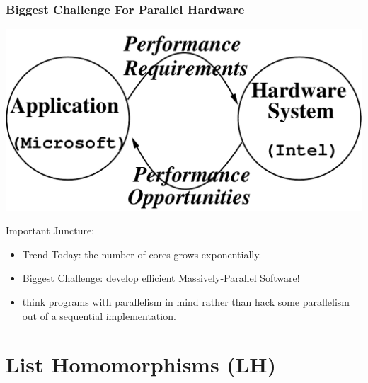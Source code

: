 \documentclass{beamer}
\renewcommand{\emph}[1]{\textcolor{structure}{#1}}
\newcommand{\emp}[1]{\textcolor{DikuRed}{ #1}}
\begin{document}
\begin{frame}[fragile,t]
\frametitle{Biggest Challenge For Parallel Hardware}

\bigskip

\includegraphics[width=29ex]{Figures/L1/Synergy}
\bigskip\pause


\emp{Important Juncture:}\medskip
\begin{itemize}
            \item \emph{Trend Today: the number of cores grows exponentially.}\medskip
            \item \alert{Biggest Challenge: develop efficient Massively-Parallel Software!}\medskip
            \item think programs with parallelism in mind rather 
                    than hack \alert{some} parallelism out of a sequential implementation.
\end  {itemize}
\end{frame}


\section{List Homomorphisms (LH)}

\begin{frame}[fragile]
	\tableofcontents[currentsection]
\end{frame}
\end{document}
